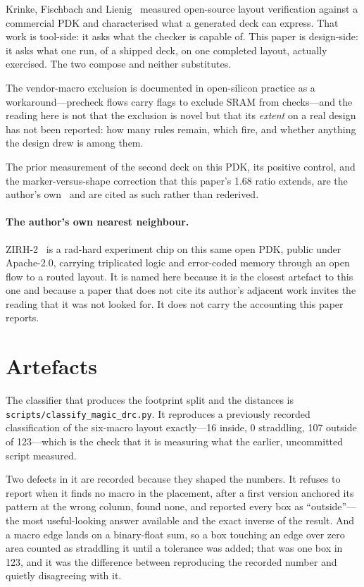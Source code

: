 \documentclass[11pt,a4paper]{article}
\newcommand{\file}[1]{\texttt{\small #1}}
\begin{document}
Krinke, Fischbach and Lienig~\cite{krinke2024} measured open-source
layout verification against a commercial PDK and characterised what a generated deck can
express. That work is tool-side: it asks what the checker is capable of.
This paper is design-side: it asks what one run, of a shipped deck, on
one completed layout, actually exercised. The two compose and neither
substitutes.

The vendor-macro exclusion is documented in open-silicon practice as a
workaround---precheck flows carry flags to exclude SRAM from
checks---and the reading here is not that the exclusion is novel but that
its \emph{extent} on a real design has not been reported: how many rules
remain, which fire, and whether anything the design drew is among them.

The prior measurement of the second deck on this PDK, its positive
control, and the marker-versus-shape correction that this paper's
\num{1.68} ratio extends, are the author's own~\cite{companion} and are
cited as such rather than rederived.

\paragraph{The author's own nearest neighbour.} ZIRH-2~\cite{zirh2} is a
rad-hard
experiment chip on this same open PDK, public under Apache-2.0, carrying
triplicated logic and error-coded memory through an open flow to a routed
layout. It is named here because it is the closest artefact to this one
and because a paper that does not cite its author's adjacent work invites
the reading that it was not looked for. It does not carry the accounting
this paper reports.

\section{Artefacts}
\label{sec:artefacts}

The classifier that produces the footprint split and the distances is
\file{scripts/classify\_magic\_drc.py}. It reproduces a previously
recorded classification of the six-macro layout exactly---\num{16} inside,
\num{0} straddling, \num{107} outside of \num{123}---which is the check
that it is measuring what the earlier, uncommitted script measured.

Two defects in it are recorded because they shaped the numbers. It
refuses to report when it finds no macro in the placement, after a first
version anchored its pattern at the wrong column, found none, and
reported every box as ``outside''---the most useful-looking answer
available and the exact inverse of the result. And a macro edge lands on
a binary-float sum, so a box touching an edge over zero area counted as
straddling it until a tolerance was added; that was one box in \num{123},
and it was the difference between reproducing the recorded number and
quietly disagreeing with it.



\end{document}
